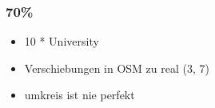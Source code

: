 
\begin{frame}
 \frametitle{70\%}
    \begin{itemize}
	\item 10 * University
	\item Verschiebungen in OSM zu real (3, 7)
	\item umkreis ist nie perfekt
    \end{itemize}
\end{frame}
